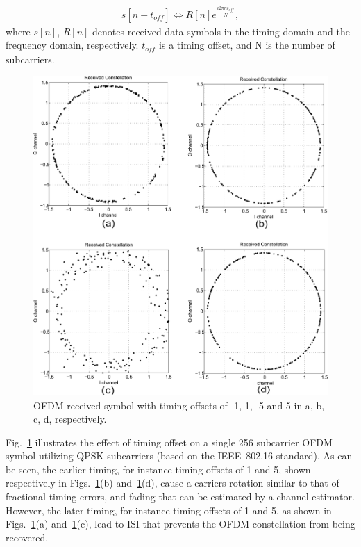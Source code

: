 \begin{eqnarray}
\label{equ:sto}
              s[n - t_{\mathit{off}}]  \Leftrightarrow R[n] e^{\frac{i2\pi n t_{\mathit{off}}}{N}},
\end{eqnarray}
where $s[n]$, $R[n]$ denotes received data symbols in the timing domain and the frequency domain, respectively. $t_{\mathit{off}}$ is a timing offset, and N is the number of subcarriers.

\begin{figure}
	\centerline{\includegraphics [width=0.8\columnwidth] {Figures/timeoff.pdf} }
	\caption{OFDM received symbol with timing offsets of -1, 1, -5 and 5 in a, b, c, d, respectively.}
	\label{fig:Timingoffsetconstellation}
\end{figure}

Fig.~\ref{fig:Timingoffsetconstellation} illustrates the effect of timing offset on a single 256 subcarrier OFDM symbol utilizing QPSK subcarriers (based on the IEEE~802.16 standard).
As can be seen, the earlier timing, for instance timing offsets of 1 and 5, shown respectively in Figs.~\ref{fig:Timingoffsetconstellation}(b) and~\ref{fig:Timingoffsetconstellation}(d), cause a carriers rotation similar to that of fractional timing errors, and fading that can be estimated by a channel estimator.
However, the later timing, for instance timing offsets of 1 and 5, as shown in Figs.~\ref{fig:Timingoffsetconstellation}(a) and~\ref{fig:Timingoffsetconstellation}(c), lead to ISI that prevents the OFDM constellation from being recovered.


